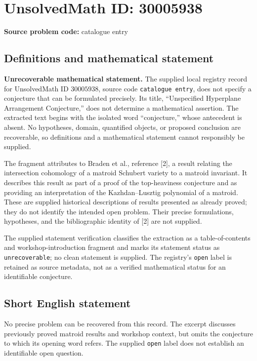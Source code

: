 \documentclass[11pt]{article}
\begin{document}
\section*{UnsolvedMath ID: 30005938}
\textbf{Source problem code:} catalogue entry
\subsection{Definitions and mathematical statement}
\textbf{Unrecoverable mathematical statement.} The supplied local registry record for UnsolvedMath ID \(30005938\), source code \texttt{catalogue entry}, does not specify a conjecture that can be formulated precisely. Its title, ``Unspecified Hyperplane Arrangement Conjecture,'' does not determine a mathematical assertion. The extracted text begins with the isolated word ``conjecture,'' whose antecedent is absent. No hypotheses, domain, quantified objects, or proposed conclusion are recoverable, so definitions and a mathematical statement cannot responsibly be supplied.

The fragment attributes to Braden et al., reference [2], a result relating the intersection cohomology of a matroid Schubert variety to a matroid invariant. It describes this result as part of a proof of the top-heaviness conjecture and as providing an interpretation of the Kazhdan--Lusztig polynomial of a matroid. These are supplied historical descriptions of results presented as already proved; they do not identify the intended open problem. Their precise formulations, hypotheses, and the bibliographic identity of [2] are not supplied.

The supplied statement verification classifies the extraction as a table-of-contents and workshop-introduction fragment and marks its statement status as \texttt{unrecoverable}; no clean statement is supplied. The registry's \texttt{open} label is retained as source metadata, not as a verified mathematical status for an identifiable conjecture.
\subsection{Short English statement}
No precise problem can be recovered from this record. The excerpt discusses previously proved matroid results and workshop context, but omits the conjecture to which its opening word refers. The supplied \texttt{open} label does not establish an identifiable open question.
\end{document}
